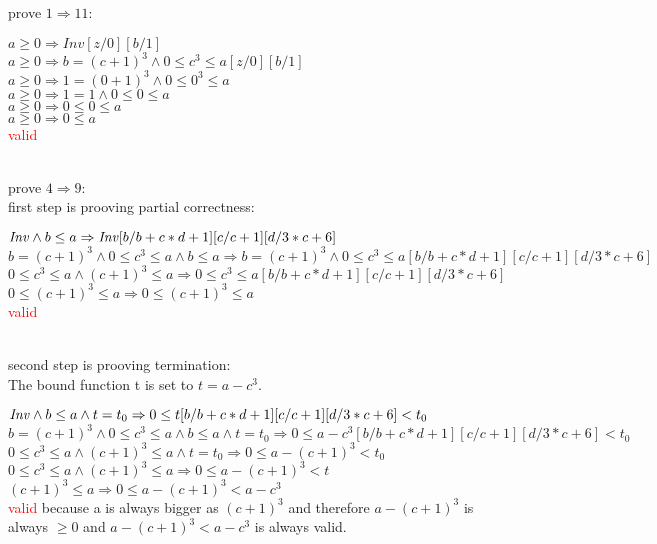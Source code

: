\documentclass[a4paper]{scrartcl}
\begin{document}
prove $1 \Rightarrow 11$:\\
\begin{center}
$a \geq 0 \Rightarrow Inv[z/0][b/1]$\\
$a \geq 0 \Rightarrow b=(c+1)^3\land 0\leq c^3\leq a[z/0][b/1] $\\
$a \geq 0 \Rightarrow 1=(0+1)^3\land 0\leq 0^3\leq a$\\
$a \geq 0 \Rightarrow 1=1 \land 0\leq 0 \leq a$\\
$a \geq 0 \Rightarrow 0 \leq 0 \leq a$\\
$a \geq 0 \Rightarrow 0 \leq a$\\
\textcolor{red}{valid}\\
\end{center} 
\\

prove $4 \Rightarrow 9$:\\
first step is prooving partial correctness:\\
\begin{center}
$\mathit{Inv} \wedge b\leq a \Rightarrow \mathit{Inv}[b/b+c*d+1][c/c+1][d/3*c+6]$\\
$b=(c+1)^3\land 0\leq c^3\leq a \wedge b\leq a \Rightarrow b=(c+1)^3\land 0\leq c^3\leq a[b/b+c*d+1][c/c+1][d/3*c+6]$\\
$0\leq c^3\leq a \wedge (c+1)^3\leq a \Rightarrow 0\leq c^3\leq a[b/b+c*d+1][c/c+1][d/3*c+6]$\\
$0\leq (c+1)^3\leq a \Rightarrow 0\leq (c+1)^3\leq a$\\
\textcolor{red}{valid}\\
\end{center} 
\\
second step is prooving termination:\\
The bound function t is set to $t = a - c^3$.\\
\begin{center}
$\mathit{Inv} \wedge b\leq a \wedge t = t_0 \Rightarrow 0 \leq t[b/b+c*d+1][c/c+1][d/3*c+6] < t_0$\\
$b=(c+1)^3\land 0\leq c^3\leq a \wedge b\leq a \wedge t = t_0 \Rightarrow 0 \leq a - c^3[b/b+c*d+1][c/c+1][d/3*c+6] < t_0$\\
$0\leq c^3\leq a \wedge (c+1)^3 \leq a \wedge t = t_0 \Rightarrow 0 \leq a - (c+1)^3 < t_0$\\
$0\leq c^3\leq a \wedge (c+1)^3 \leq a \Rightarrow 0 \leq a - (c+1)^3 < t$\\
$ (c+1)^3 \leq a \Rightarrow 0 \leq a - (c+1)^3 < a - c^3$\\
\textcolor{red}{valid} because a is always bigger as $(c+1)^3$ and therefore $a - (c+1)^3$ is always $\geq 0$ and $a - (c+1)^3 < a - c^3$ is always valid.\\
\end{center} 
\\
\end{document}
